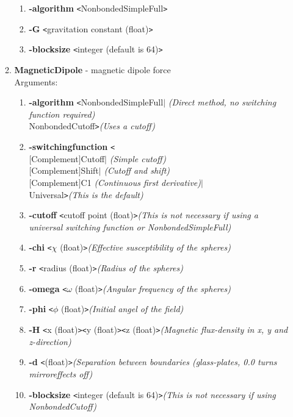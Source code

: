 \documentclass[11pt]{report}
\newcommand{\tempstart}{\texttt{<}}
\newcommand{\tempend}{\texttt{>}}
\begin{document}
\begin{enumerate}
\begin{enumerate}
\begin{enumerate}
    \item {\bf -algorithm} \tempstart NonbondedSimpleFull\tempend 
    \item {\bf -G} \tempstart gravitation constant (float)\tempend 
    \item {\bf -blocksize} \tempstart integer (default is 64)\tempend 
    \end{enumerate}
\newpage
  \item {\bf MagneticDipole} - magnetic dipole force\\
    Arguments:
    \begin{enumerate}
    \item {\bf -algorithm} \tempstart       NonbondedSimpleFull$|$ {\it (Direct method, no switching function required)}\\
      NonbondedCutoff\tempend  {\it (Uses a cutoff)}
    \item {\bf -switchingfunction} \tempstart \\
      $[$Complement$]$Cutoff$|$ {\it (Simple cutoff)}\\
      $[$Complement$]$Shift$|$ {\it (Cutoff and shift)} \\
      $[$Complement$]$C1 {\it (Continuous first derivative)}$|$\\
      Universal\tempend  {\it (This is the default)}
    \item {\bf -cutoff} \tempstart cutoff point (float)\tempend  {\it (This is not
        necessary if using a universal switching function or
        NonbondedSimpleFull)}
    \item {\bf -chi} \tempstart $\chi$ (float)\tempend {\it (Effective susceptibility of the spheres)}
    \item {\bf -r} \tempstart radius (float)\tempend {\it (Radius of the spheres)}
    \item {\bf -omega} \tempstart $\omega$ (float)\tempend {\it (Angular frequency of the spheres)}
    \item {\bf -phi} \tempstart $\phi$ (float)\tempend {\it (Initial angel of the field)}
    \item {\bf -H} \tempstart x (float)\tempend \tempstart y (float)\tempend \tempstart z (float)\tempend {\it (Magnetic flux-density in x, y and z-direction)}
    \item {\bf -d} \tempstart  (float)\tempend {\it (Separation
between boundaries (glass-plates, 0.0 turns mirroreffects off)}
    \item {\bf -blocksize} \tempstart integer (default is 64)\tempend   {\it (This is not
        necessary if using NonbondedCutoff)}      

\end{enumerate}
\end{enumerate}
\end{enumerate}
\end{document}
